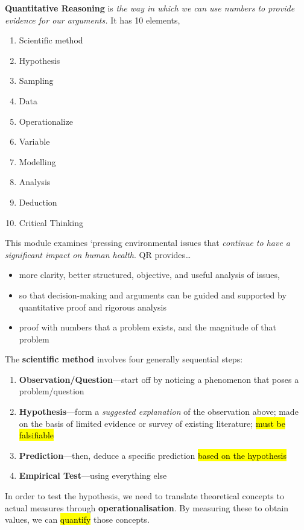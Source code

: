 \documentclass{article}
\newcommand{\headingsmall}[1]{{\small\textbf{#1}}}
\begin{document}
\begin{multicols*}{4}
\headingsmall{Quantitative Reasoning} is \textit{
    the way in which we can use numbers to provide evidence for our 
    arguments.
} It has 10 elements,
\begin{enumerate} \itemsep -0.5em
    \item Scientific method
    \item Hypothesis
    \item Sampling
    \item Data
    \item Operationalize
    \item Variable
    \item Modelling
    \item Analysis
    \item Deduction
    \item Critical Thinking
\end{enumerate}
This module examines `pressing environmental issues that
\textit{continue to have a significant impact on human health}. QR
provides\dots
\begin{itemize} \itemsep -0.5em
    \item more clarity, better structured, objective, and useful 
        analysis of issues, 
    \item so that decision-making and arguments can be guided and
        supported by quantitative proof and rigorous analysis
    \item proof with numbers that a problem exists, and the magnitude
        of that problem
\end{itemize}

The \headingsmall{scientific method} involves four generally 
sequential steps:
\begin{enumerate} \itemsep -0.5em
    \item \textbf{Observation/Question}---start off by noticing a phenomenon
        that poses a problem/question
    \item \textbf{Hypothesis}---form a \textit{suggested explanation} of the
        observation above; made on the basis of limited evidence or
        survey of existing literature; \hl{must be falsifiable}
    \item \textbf{Prediction}---then, deduce a specific prediction
        \hl{based on the hypothesis}
    \item \textbf{Empirical Test}---using everything else
\end{enumerate}

In order to test the hypothesis, we need to translate theoretical
concepts to actual measures through \headingsmall{operationalisation}.
By measuring these to obtain values, we can \hl{quantify} those concepts. \\


\end{multicols*}
\end{document}
